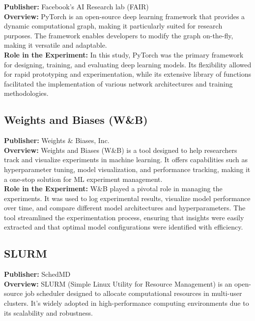 \textbf{Publisher:} Facebook's AI Research lab (FAIR)\\

\textbf{Overview:}
PyTorch is an open-source deep learning framework that provides a dynamic computational graph, making it particularly suited for research purposes. The framework enables developers to modify the graph on-the-fly, making it versatile and adaptable.\\

\textbf{Role in the Experiment:}
In this study, PyTorch was the primary framework for designing, training, and evaluating deep learning models. Its flexibility allowed for rapid prototyping and experimentation, while its extensive library of functions facilitated the implementation of various network architectures and training methodologies.

\subsection{Weights and Biases (W\&B)}

\textbf{Publisher:} Weights \& Biases, Inc.\\

\textbf{Overview:}
Weights and Biases (W\&B) is a tool designed to help researchers track and visualize experiments in machine learning. It offers capabilities such as hyperparameter tuning, model visualization, and performance tracking, making it a one-stop solution for ML experiment management.\\

\textbf{Role in the Experiment:}
W\&B played a pivotal role in managing the experiments. It was used to log experimental results, visualize model performance over time, and compare different model architectures and hyperparameters. The tool streamlined the experimentation process, ensuring that insights were easily extracted and that optimal model configurations were identified with efficiency.

\subsection{SLURM}

\textbf{Publisher:} SchedMD\\

\textbf{Overview:}
SLURM (Simple Linux Utility for Resource Management) is an open-source job scheduler designed to allocate computational resources in multi-user clusters. It's widely adopted in high-performance computing environments due to its scalability and robustness.\\

